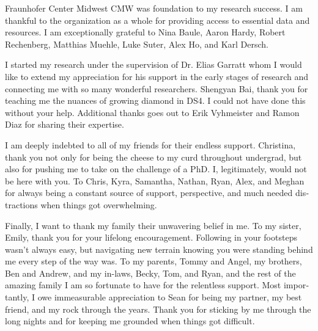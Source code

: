 \documentclass{msuphddissertation_ssn}
\begin{document}
\begin{otherlanguage}{english}
\begin{acknowledgment}
Fraunhofer Center Midwest CMW was foundation to my research success. I am thankful to the organization as a whole for providing access to essential data and resources. I am exceptionally grateful to Nina Baule, Aaron Hardy, Robert Rechenberg, Matthias Muehle, Luke Suter, Alex Ho, and Karl Dersch.

I started my research under the supervision of Dr. Elias Garratt whom I would like to extend my appreciation for his support in the early stages of research and connecting me with so many wonderful researchers. Shengyan Bai, thank you for teaching me the nuances of growing diamond in DS4. I could not have done this without your help. Additional thanks goes out to Erik Vyhmeister and Ramon Diaz for sharing their expertise. 

I am deeply indebted to all of my friends for their endless support. Christina, thank you not only for being the cheese to my curd throughout undergrad, but also for pushing me to take on the challenge of a PhD. I, legitimately, would not be here with you. To Chris, Kyra, Samantha, Nathan, Ryan, Alex, and Meghan for always being a constant source of support, perspective, and much needed distractions when things got overwhelming.

Finally, I want to thank my family their unwavering belief in me. To my sister, Emily, thank you for your lifelong encouragement. Following in your footsteps wasn't always easy, but navigating new terrain knowing you were standing behind me every step of the way was. To my parents, Tommy and Angel, my brothers, Ben and Andrew, and my in-laws, Becky, Tom, and Ryan, and the rest of the amazing family I am so fortunate to have for the relentless support. Most importantly, I owe immeasurable appreciation to Sean for being my partner, my best friend, and my rock through the years. Thank you for sticking by me through the long nights and for keeping me grounded when things got difficult.

\end{acknowledgment}


\TOC %


\end{otherlanguage}
\end{document}
